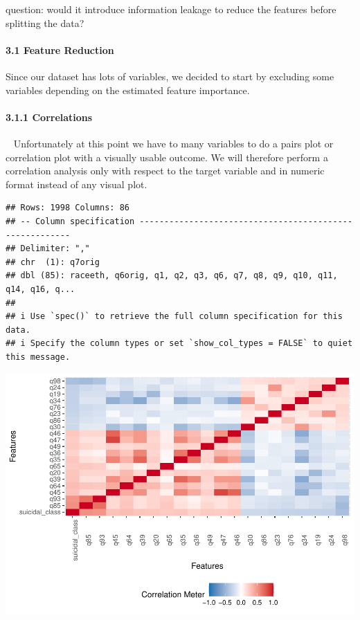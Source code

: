 \documentclass[
]{article}
\begin{document}
question: would it introduce information leakage to reduce the features
before splitting the data?

\hypertarget{feature-reduction}{%
\paragraph{3.1 Feature Reduction}\label{feature-reduction}}

\hfill\break
Since our dataset has lots of variables, we decided to start by
excluding some variables depending on the estimated feature importance.

\hypertarget{correlations}{%
\paragraph{3.1.1 Correlations}\label{correlations}}

~ Unfortunately at this point we have to many variables to do a pairs
plot or correlation plot with a visually usable outcome. We will
therefore perform a correlation analysis only with respect to the target
variable and in numeric format instead of any visual plot.

\begin{verbatim}
## Rows: 1998 Columns: 86
## -- Column specification --------------------------------------------------------
## Delimiter: ","
## chr  (1): q7orig
## dbl (85): raceeth, q6orig, q1, q2, q3, q6, q7, q8, q9, q10, q11, q14, q16, q...
## 
## i Use `spec()` to retrieve the full column specification for this data.
## i Specify the column types or set `show_col_types = FALSE` to quiet this message.
\end{verbatim}

\includegraphics{report_pdf_files/figure-latex/corr plot-1.pdf}
\end{document}
